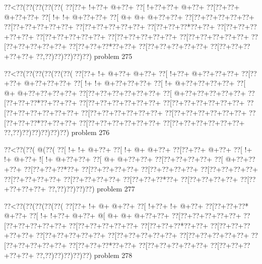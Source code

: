 \vbox{\vbox{\goo
\0??<\0??(\0??(\0??(\0??(\0??(
\0??[\0??+\- !+\0??+\- @+\0??+
\0??[\- !+\0??+\0??+\- @+\0??+
\0??[\0??+\0??+\- @+\0??+\0??+
\0??[\- !+\- !+\- @+\0??+\0??+
\0??[\- @+\- @+\- @+\0??+\0??+
\0??[\0??+\0??+\0??+\0??+\0??+
\0??[\0??+\0??+\0??+\0??+\0??+
\0??[\0??+\0??+\0??+\0??+\0??+
\0??[\0??+\0??+\0??*\0??+\0??+
\0??[\0??+\0??+\0??+\0??+\0??+
\0??[\0??+\0??+\0??+\0??+\0??+
\0??[\0??+\0??+\0??+\0??+\0??+
\0??[\0??+\0??+\0??+\0??+\0??+
\0??[\0??+\0??+\0??+\0??+\0??+
\0??[\0??+\0??+\0??*\0??+\0??+
\0??[\0??+\0??+\0??+\0??+\0??+
\0??[\0??+\0??+\0??+\0??+\0??+
\0??,\0??)\0??)\0??)\0??)\0??)
}
\hfil problem 275\hfil\break
}

\vbox{\vbox{\goo
\0??<\0??(\0??(\0??(\0??(\0??(\0??(
\0??[\0??+\- !+\- @+\0??+\- @+\0??+
\0??[\- !+\0??+\- @+\0??+\0??+\0??+
\0??[\0??+\0??+\- @+\0??+\0??+\0??+
\0??[\- !+\- !+\- @+\0??+\0??+\0??+
\0??[\- !+\- @+\0??+\0??+\0??+\0??+
\0??[\- @+\- @+\0??+\0??+\0??+\0??+
\0??[\0??+\0??+\0??+\0??+\0??+\0??+
\0??[\- @+\0??+\0??+\0??+\0??+\0??+
\0??[\0??+\0??+\0??*\0??+\0??+\0??+
\0??[\0??+\0??+\0??+\0??+\0??+\0??+
\0??[\0??+\0??+\0??+\0??+\0??+\0??+
\0??[\0??+\0??+\0??+\0??+\0??+\0??+
\0??[\0??+\0??+\0??+\0??+\0??+\0??+
\0??[\0??+\0??+\0??+\0??+\0??+\0??+
\0??[\0??+\0??+\0??*\0??+\0??+\0??+
\0??[\0??+\0??+\0??+\0??+\0??+\0??+
\0??[\0??+\0??+\0??+\0??+\0??+\0??+
\0??,\0??)\0??)\0??)\0??)\0??)\0??)
}
\hfil problem 276\hfil\break
}

\vbox{\vbox{\goo
\0??<\0??(\0??(\- @(\0??(
\0??[\- !+\- !+\- @+\0??+
\0??[\- !+\- @+\- @+\0??+
\0??[\0??+\0??+\- @+\0??+
\0??[\- !+\- !+\- @+\0??+
\- ![\- !+\- @+\0??+\0??+
\0??[\- @+\- @+\0??+\0??+
\0??[\0??+\0??+\0??+\0??+
\0??[\- @+\0??+\0??+\0??+
\0??[\0??+\0??+\0??*\0??+
\0??[\0??+\0??+\0??+\0??+
\0??[\0??+\0??+\0??+\0??+
\0??[\0??+\0??+\0??+\0??+
\0??[\0??+\0??+\0??+\0??+
\0??[\0??+\0??+\0??+\0??+
\0??[\0??+\0??+\0??*\0??+
\0??[\0??+\0??+\0??+\0??+
\0??[\0??+\0??+\0??+\0??+
\0??,\0??)\0??)\0??)\0??)
}
\hfil problem 277\hfil\break
}

\vbox{\vbox{\goo
\0??<\0??(\0??(\0??(\0??(\0??(
\0??[\0??+\- !+\- @+\- @+\0??+
\0??[\- !+\0??+\- !+\- @+\0??+
\0??[\0??+\0??+\0??*\- @+\0??+
\0??[\- !+\- !+\0??+\- @+\0??+
\- @[\- @+\- @+\- @+\0??+\0??+
\0??[\0??+\0??+\0??+\0??+\0??+
\0??[\0??+\0??+\0??+\0??+\0??+
\0??[\0??+\0??+\0??+\0??+\0??+
\0??[\0??+\0??+\0??*\0??+\0??+
\0??[\0??+\0??+\0??+\0??+\0??+
\0??[\0??+\0??+\0??+\0??+\0??+
\0??[\0??+\0??+\0??+\0??+\0??+
\0??[\0??+\0??+\0??+\0??+\0??+
\0??[\0??+\0??+\0??+\0??+\0??+
\0??[\0??+\0??+\0??*\0??+\0??+
\0??[\0??+\0??+\0??+\0??+\0??+
\0??[\0??+\0??+\0??+\0??+\0??+
\0??,\0??)\0??)\0??)\0??)\0??)
}
\hfil problem 278\hfil\break
}

